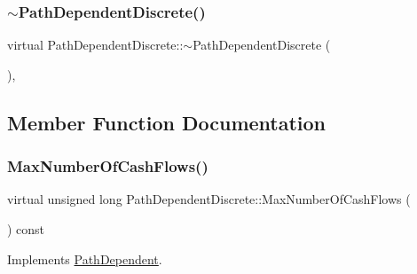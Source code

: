 \hypertarget{classPathDependentDiscrete_a22f40a8bd13e87058619a76abe31c71e}{}\label{classPathDependentDiscrete_a22f40a8bd13e87058619a76abe31c71e} 
\subsubsection{\texorpdfstring{$\sim$\+Path\+Dependent\+Discrete()}{~PathDependentDiscrete()}}
{\footnotesize\ttfamily virtual Path\+Dependent\+Discrete\+::$\sim$\+Path\+Dependent\+Discrete (\begin{DoxyParamCaption}{ }\end{DoxyParamCaption})\hspace{0.3cm}{\ttfamily [inline]}, {\ttfamily [virtual]}}



\subsection{Member Function Documentation}
\hypertarget{classPathDependentDiscrete_a1e320feec16a1a2b222b3e84266d7282}{}\label{classPathDependentDiscrete_a1e320feec16a1a2b222b3e84266d7282} 
\subsubsection{\texorpdfstring{Max\+Number\+Of\+Cash\+Flows()}{MaxNumberOfCashFlows()}}
{\footnotesize\ttfamily virtual unsigned long Path\+Dependent\+Discrete\+::\+Max\+Number\+Of\+Cash\+Flows (\begin{DoxyParamCaption}{ }\end{DoxyParamCaption}) const\hspace{0.3cm}{\ttfamily [virtual]}}



Implements \hyperlink{classPathDependent_a1ee091a4f3680339683af087dfb4ca0f}{Path\+Dependent}.

\hypertarget{classPathDependentDiscrete_aabb04f6c6027547a879ea765eb90675d}{}\label{classPathDependentDiscrete_aabb04f6c6027547a879ea765eb90675d} 
